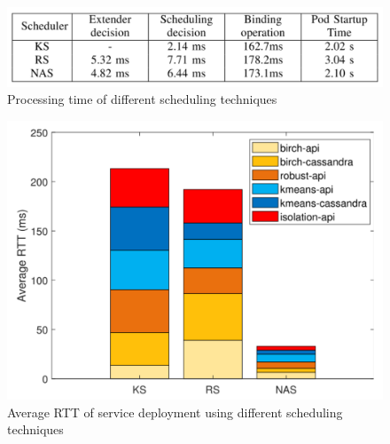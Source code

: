 \begin{figure}
  \centering
  \includegraphics[width=\linewidth]{figures/mlcn-k8s-exec-time.pdf}
  \caption{Processing time of different scheduling techniques\cite{Santos2019}}
  \label{fig:k8s-exec-t}
\end{figure}
\begin{figure}
  \centering
  \includegraphics[width=\linewidth]{figures/mlcn-k8s-scheduler-compare.pdf}
  \caption{Average RTT of service deployment using different scheduling techniques\cite{Santos2019}}
  \label{fig:k8s-comapre-sc}
\end{figure}
